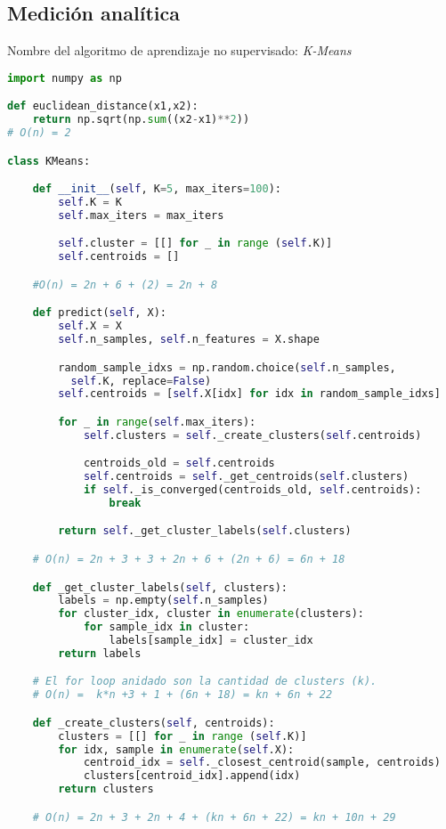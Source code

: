 \documentclass{article}
\begin{document}
\subsection{Medición analítica}
Nombre del algoritmo de aprendizaje no supervisado: \textit{K-Means}
\begin{lstlisting}[language=Python]
import numpy as np

def euclidean_distance(x1,x2):
    return np.sqrt(np.sum((x2-x1)**2))
# O(n) = 2

class KMeans:

    def __init__(self, K=5, max_iters=100):
        self.K = K
        self.max_iters = max_iters

        self.cluster = [[] for _ in range (self.K)]
        self.centroids = []

    #O(n) = 2n + 6 + (2) = 2n + 8

    def predict(self, X):
        self.X = X
        self.n_samples, self.n_features = X.shape

        random_sample_idxs = np.random.choice(self.n_samples,
          self.K, replace=False)
        self.centroids = [self.X[idx] for idx in random_sample_idxs]

        for _ in range(self.max_iters):
            self.clusters = self._create_clusters(self.centroids)

            centroids_old = self.centroids
            self.centroids = self._get_centroids(self.clusters)
            if self._is_converged(centroids_old, self.centroids):
                break

        return self._get_cluster_labels(self.clusters)

    # O(n) = 2n + 3 + 3 + 2n + 6 + (2n + 6) = 6n + 18

    def _get_cluster_labels(self, clusters):
        labels = np.empty(self.n_samples)
        for cluster_idx, cluster in enumerate(clusters):
            for sample_idx in cluster:
                labels[sample_idx] = cluster_idx
        return labels

    # El for loop anidado son la cantidad de clusters (k).
    # O(n) =  k*n +3 + 1 + (6n + 18) = kn + 6n + 22

    def _create_clusters(self, centroids):
        clusters = [[] for _ in range (self.K)]
        for idx, sample in enumerate(self.X):
            centroid_idx = self._closest_centroid(sample, centroids)
            clusters[centroid_idx].append(idx)
        return clusters

    # O(n) = 2n + 3 + 2n + 4 + (kn + 6n + 22) = kn + 10n + 29


\end{lstlisting}
\end{document}
